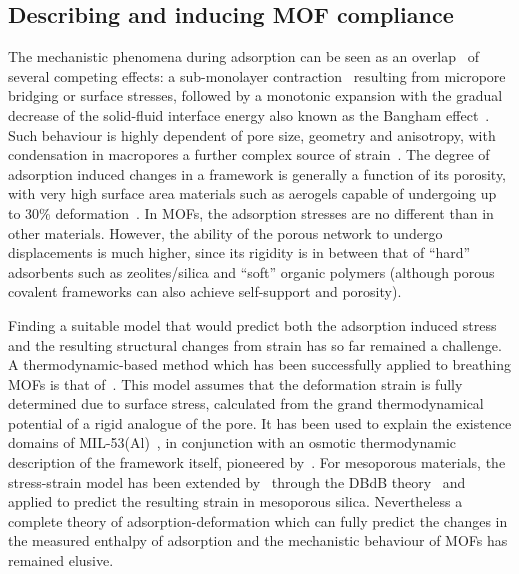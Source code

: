 \subsection{Describing and inducing MOF compliance}

The mechanistic phenomena during adsorption can be 
seen as an overlap~\cite{gorAdsorptionInducedDeformationMesoporous2010}
of several competing effects: a sub-monolayer
contraction~\cite{daceyVolumeChangesSaran1971} resulting
from micropore bridging or surface stresses, followed by a monotonic 
expansion with the gradual decrease of the solid-fluid interface energy
also known as the Bangham 
effect~\cite{banghamExpansionCharcoalAccompanying1928}. 
Such behaviour is highly dependent of pore size, geometry and anisotropy,
with condensation in macropores a further complex source of 
strain~\cite{dolinoAdsorptionStrainsPorous1996, %
ambergSTUDYADSORPTIONHYSTERESIS1952, %
guntherNovelInsightsNanopore2008}. The degree of adsorption induced
changes in a framework is generally a function of its porosity, 
with very high 
surface area materials such as aerogels capable of undergoing up 
to 30\% deformation~\cite{reichenauerNitrogenSorptionAerogels2001}.
In \glspl{MOF}, the adsorption stresses are no different than in other 
materials. However, the ability of the porous network to undergo
displacements is much higher, since its rigidity is in 
between that of ``hard'' adsorbents such as zeolites/silica and 
``soft'' organic polymers (although porous covalent frameworks can
also achieve self-support and porosity).

Finding a suitable model that would predict both the adsorption
induced stress and the resulting structural changes from strain
has so far remained a challenge. A thermodynamic-based method which
has been successfully applied to breathing \glspl{MOF} is that 
of~\citet{neimarkStressBasedModelBreathing2010}. This model assumes
that the deformation strain is fully determined due to surface stress,
calculated from the grand thermodynamical potential of a rigid analogue of
the pore. It has been used to explain the existence 
domains of MIL-53(Al)~\cite{boutinBehaviorFlexibleMIL532010}, in 
conjunction with an osmotic thermodynamic description of 
the framework itself, pioneered by~\citet{coudertThermodynamicsGuestInducedStructural2008}.
For mesoporous materials, the stress-strain model has been extended 
by~\citet{gorAdsorptionInducedDeformationMesoporous2010} through
the \gls{DBdB} theory~\cite{broekhoffStudiesPoreSystems1967} and applied to
predict the resulting strain in mesoporous silica.
Nevertheless a complete theory of adsorption-deformation 
which can fully predict the changes in the measured enthalpy of 
adsorption and the mechanistic behaviour of \glspl{MOF} has remained elusive.

